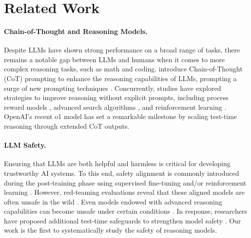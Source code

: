 \section{Related Work}
\paragraph{Chain-of-Thought and Reasoning Models.}
Despite LLMs have shown strong performance on a broad range of tasks, there remains a notable gap between LLMs and humans when it comes to more complex reasoning tasks, such as math and coding. \citet{wei2022chain} introduce Chain-of-Thought (CoT) prompting to enhance the reasoning capabilities of LLMs, prompting a surge of new prompting techniques \citep{NEURIPS2022_8bb0d291, zhou2023leasttomost}. Concurrently, studies have explored strategies to improve reasoning without explicit prompts, including process reward models \citep{lightman2023let}, advanced search algorithms \citep{feng2023alphazero, yao2024tree}, and reinforcement learning \citep{kumar2025training, guo2025deepseek}. OpenAI’s recent o1 model \citep{jaech2024openai} has set a remarkable milestone by scaling test-time reasoning through extended CoT outputs.

\paragraph{LLM Safety.}
Ensuring that LLMs are both helpful and harmless is critical for developing trustworthy AI systems. To this end, safety alignment is commonly introduced during the post-training phase using supervised fine-tuning and/or reinforcement learning \citep{bai2022training, bai2022constitutional, NEURIPS2022_b1efde53, touvron2023llama, guan2024deliberative}. However, red-teaming evaluations reveal that these aligned models are often unsafe in the wild \citep{wei2023jailbroken, zou2023universal, liu2024autodan, jiang-etal-2024-artprompt, pmlr-v235-mazeika24a}. Even models endowed with advanced reasoning capabilities can become unsafe under certain conditions \citep{xiang2024badchain, jaech2024openai}. In response, researchers have proposed additional test-time safeguards to strengthen model safety \citep{inan2023llama, xu-etal-2024-safedecoding}. Our work is the first to systematically study the safety of reasoning models.